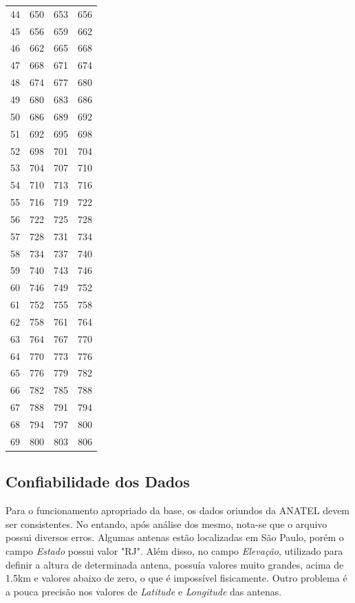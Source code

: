 \begin{center}
\begin{longtable}{cccc}
44 & 650 & 653 & 656 \\ 
45 & 656 & 659 & 662 \\ 
46 & 662 & 665 & 668 \\ 
47 & 668 & 671 & 674 \\ 
48 & 674 & 677 & 680 \\ 
49 & 680 & 683 & 686 \\ 
50 & 686 & 689 & 692 \\ 
51 & 692 & 695 & 698 \\ 
52 & 698 & 701 & 704 \\ 
53 & 704 & 707 & 710 \\ 
54 & 710 & 713 & 716 \\ 
55 & 716 & 719 & 722 \\ 
56 & 722 & 725 & 728 \\ 
57 & 728 & 731 & 734 \\ 
58 & 734 & 737 & 740 \\ 
59 & 740 & 743 & 746 \\ 
60 & 746 & 749 & 752 \\ 
61 & 752 & 755 & 758 \\ 
62 & 758 & 761 & 764 \\ 
63 & 764 & 767 & 770 \\ 
64 & 770 & 773 & 776 \\ 
65 & 776 & 779 & 782 \\ 
66 & 782 & 785 & 788 \\ 
67 & 788 & 791 & 794 \\ 
68 & 794 & 797 & 800 \\ 
69 & 800 & 803 & 806 \\ 

\end{longtable}
\end{center}


\subsection{Confiabilidade dos Dados}

Para o funcionamento apropriado da base, os dados oriundos da ANATEL devem ser consistentes. No entando, após análise dos mesmo, nota-se que o arquivo possui diversos erros. Algumas antenas estão localizadas em São Paulo, porém o campo \textit{Estado} possui valor "RJ". Além disso, no campo \textit{Elevação}, utilizado para definir a altura de determinada antena, possuía valores muito grandes, acima de 1.5km e valores abaixo de zero, o que é impossível fisicamente.
Outro problema é a pouca precisão nos valores de \textit{Latitude} e \textit{Longitude} das antenas.

